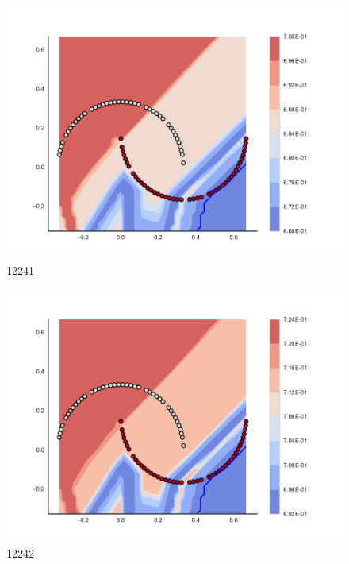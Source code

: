 \begin{subfigure}[b]{0.09\textwidth}
    \includegraphics[clip, trim=2.35cm 1.75cm 4.5cm 0cm,width=\textwidth]{img/convergence/12241.pdf}
    \caption{12241}
    \label{fig:convergence_12241}
\end{subfigure}
%
\begin{subfigure}[b]{0.09\textwidth}
    \includegraphics[clip, trim=2.35cm 1.75cm 4.5cm 0cm,width=\textwidth]{img/convergence/12242.pdf}
    \caption{12242}
    \label{fig:convergence_12242}
\end{subfigure}
%
